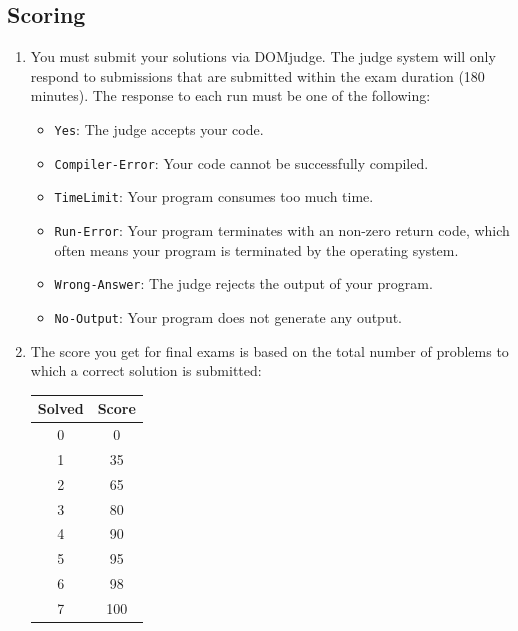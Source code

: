 \subsection*{Scoring}
\begin{enumerate}
    \item You must submit your solutions via DOMjudge. The judge system will only respond to submissions that are submitted within the exam duration (180 minutes). The response to each run must be one of the following:
        \begin{itemize}
            \item \texttt{Yes}: The judge accepts your code.
            \item \texttt{Compiler-Error}: Your code cannot be successfully compiled.
            \item \texttt{TimeLimit}: Your program consumes too much time.
            \item \texttt{Run-Error}: Your program terminates with an non-zero return code, which often means your program is terminated by the operating system.
            \item \texttt{Wrong-Answer}: The judge rejects the output of your program.
            \item \texttt{No-Output}: Your program does not generate any output.
        \end{itemize}
    \item The score you get for final exams is based on the total number of problems to which a correct solution is submitted:
        \begin{center}
            \begin{tabular}{cc}
                \toprule
                    Solved & Score \\
                \midrule
                    0 & 0 \\
                    1 & 35 \\
                    2 & 65 \\
                    3 & 80 \\
                    4 & 90 \\
                    5 & 95 \\
                    6 & 98 \\
                    7 & 100 \\
                \bottomrule
            \end{tabular}
        \end{center}
\end{enumerate}
\clearpage  %
